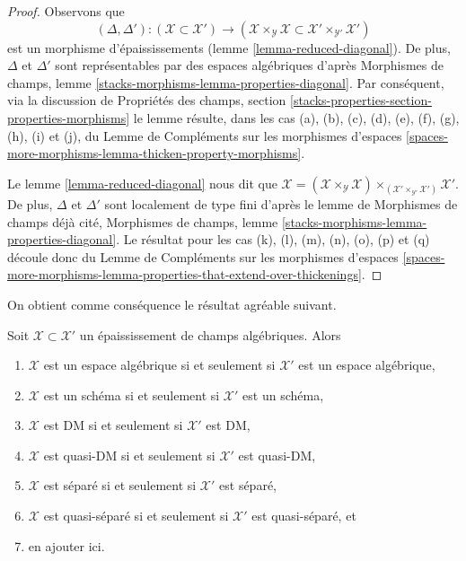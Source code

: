 \begin{proof}
Observons que
$$
(\Delta, \Delta') :
(\mathcal{X} \subset \mathcal{X}')
\longrightarrow
(\mathcal{X} \times_\mathcal{Y} \mathcal{X} \subset
\mathcal{X}' \times_{\mathcal{Y}'} \mathcal{X}')
$$
est un morphisme d'épaississements (lemme \ref{lemma-reduced-diagonal}).
De plus, $\Delta$ et $\Delta'$ sont
représentables par des espaces algébriques d'après
Morphismes de champs, lemme \ref{stacks-morphisms-lemma-properties-diagonal}.
Par conséquent, via la discussion de
Propriétés des champs, section
\ref{stacks-properties-section-properties-morphisms}
le lemme résulte, dans les cas (a), (b), (c), (d),
(e), (f), (g), (h), (i) et (j), du
Lemme de Compléments sur les morphismes d'espaces
\ref{spaces-more-morphisms-lemma-thicken-property-morphisms}.

\medskip\noindent
Le lemme \ref{lemma-reduced-diagonal} nous dit que
$\mathcal{X} = (\mathcal{X} \times_\mathcal{Y} \mathcal{X})
\times_{(\mathcal{X}' \times_{\mathcal{Y}'} \mathcal{X}')} \mathcal{X}'$.
De plus, $\Delta$ et $\Delta'$ sont localement de type fini d'après
le lemme de Morphismes de champs déjà cité,
Morphismes de champs, lemme \ref{stacks-morphisms-lemma-properties-diagonal}.
Le résultat pour les cas (k), (l), (m), (n), (o), (p) et (q) découle donc du
Lemme de Compléments sur les morphismes d'espaces
\ref{spaces-more-morphisms-lemma-properties-that-extend-over-thickenings}.
\end{proof}

\noindent
On obtient comme conséquence le résultat agréable suivant.

\begin{lemma}
\label{lemma-thickening-properties}
\begin{reference}
\cite[Theorem 2.2.5]{Conrad-moduli}
\end{reference}
Soit $\mathcal{X} \subset \mathcal{X}'$ un épaississement de
champs algébriques. Alors
\begin{enumerate}
\item $\mathcal{X}$ est un espace algébrique si et seulement si $\mathcal{X}'$
est un espace algébrique,
\item $\mathcal{X}$ est un schéma si et seulement si $\mathcal{X}'$ est un schéma,
\item $\mathcal{X}$ est DM si et seulement si $\mathcal{X}'$ est DM,
\item $\mathcal{X}$ est quasi-DM si et seulement si $\mathcal{X}'$ est quasi-DM,
\item $\mathcal{X}$ est séparé si et seulement si $\mathcal{X}'$ est séparé,
\item $\mathcal{X}$ est quasi-séparé si et seulement si $\mathcal{X}'$ est
quasi-séparé, et
\item en ajouter ici.
\end{enumerate}
\end{lemma}

